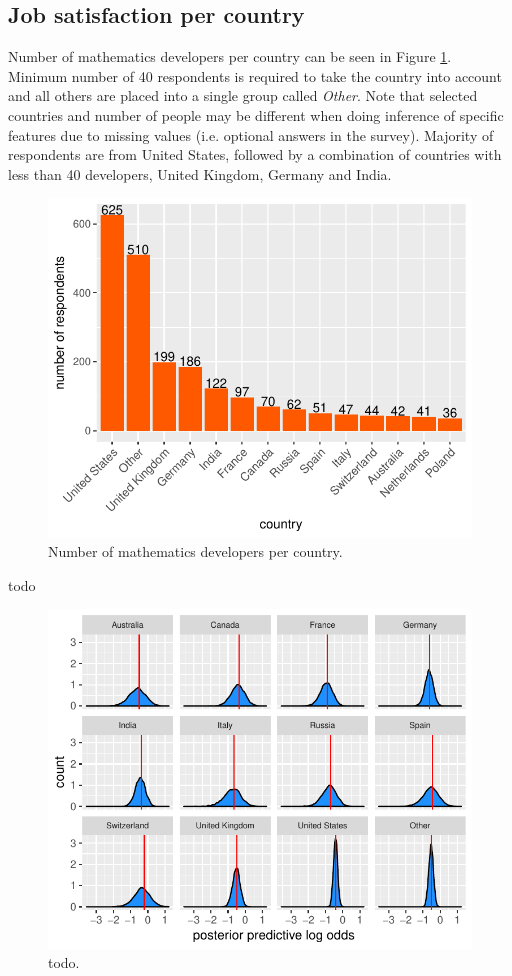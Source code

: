 \documentclass{article}
\begin{document}
\subsection{Job satisfaction per country}
Number of mathematics developers per country can be seen in Figure \ref{fig_0}. Minimum number of 40 respondents is required to take the country into account and all others are placed into a single group called \textit{Other}. Note that selected countries and number of people may be different when doing inference of specific features due to missing values (i.e. optional answers in the survey). Majority of respondents are from United States, followed by a combination of countries with less than 40 developers, United Kingdom, Germany and India.


\begin{figure}[H]
\centering
\includegraphics{report-005}
\caption{Number of mathematics developers per country.}\label{fig_0}
\end{figure}

todo





\begin{figure}[H]
\centering
\includegraphics{report-010}
\caption{todo.}\label{fig_1}
\end{figure}
\end{document}
